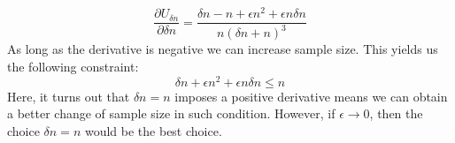 \documentclass{article}
\begin{document}
\begin{equation*}
	\frac{\partial U_{\delta n}}{\partial \delta n} = 
	\frac{\delta n - n + \epsilon n^2
	+ \epsilon n \delta n}{n(\delta n + n)^3}
\end{equation*}
As long as the
derivative is negative we can increase sample size. This yields us the following
constraint: 
\begin{equation*}
	\delta n + \epsilon n^2 + \epsilon n \delta n \leq n 
\end{equation*}
Here, it turns out that $\delta n = n$ imposes a positive derivative means
we can obtain a better change of sample size in such condition. However, if
$\epsilon \rightarrow 0$, then the choice $\delta n = n$ would be the best
choice.\\
\end{document}
